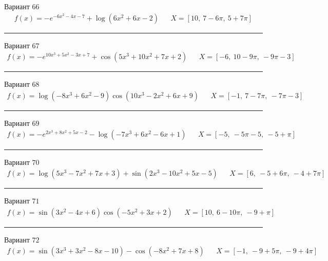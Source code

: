 \documentclass[11pt]{report}
\begin{document}
Вариант \(66\)
\begin{align*}
    f(x) = - e^{- 6 x^{2} - 4 x - 7} + \log{\left(6 x^{2} + 6 x - 2 \right)} && X = \left[ 10, \  7 - 6 \pi, \  5 + 7 \pi\right]
\end{align*}
\begin{center}
    \noindent\rule{8cm}{0.4pt}
\end{center}
Вариант \(67\)
\begin{align*}
    f(x) = - e^{10 x^{3} + 5 x^{2} - 3 x + 7} + \cos{\left(5 x^{3} + 10 x^{2} + 7 x + 2 \right)} && X = \left[ -6, \  10 - 9 \pi, \  - 9 \pi - 3\right]
\end{align*}
\begin{center}
    \noindent\rule{8cm}{0.4pt}
\end{center}
Вариант \(68\)
\begin{align*}
    f(x) = \log{\left(- 8 x^{3} + 6 x^{2} - 9 \right)} \cos{\left(10 x^{3} - 2 x^{2} + 6 x + 9 \right)} && X = \left[ -1, \  7 - 7 \pi, \  - 7 \pi - 3\right]
\end{align*}
\begin{center}
    \noindent\rule{8cm}{0.4pt}
\end{center}
Вариант \(69\)
\begin{align*}
    f(x) = - e^{2 x^{3} + 8 x^{2} + 5 x - 2} - \log{\left(- 7 x^{3} + 6 x^{2} - 6 x + 1 \right)} && X = \left[ -5, \  - 5 \pi - 5, \  -5 + \pi\right]
\end{align*}
\begin{center}
    \noindent\rule{8cm}{0.4pt}
\end{center}
Вариант \(70\)
\begin{align*}
    f(x) = \log{\left(5 x^{3} - 7 x^{2} + 7 x + 3 \right)} + \sin{\left(2 x^{3} - 10 x^{2} + 5 x - 5 \right)} && X = \left[ 6, \  -5 + 6 \pi, \  -4 + 7 \pi\right]
\end{align*}
\begin{center}
    \noindent\rule{8cm}{0.4pt}
\end{center}
Вариант \(71\)
\begin{align*}
    f(x) = \sin{\left(3 x^{2} - 4 x + 6 \right)} \cos{\left(- 5 x^{2} + 3 x + 2 \right)} && X = \left[ 10, \  6 - 10 \pi, \  -9 + \pi\right]
\end{align*}
\begin{center}
    \noindent\rule{8cm}{0.4pt}
\end{center}
Вариант \(72\)
\begin{align*}
    f(x) = \sin{\left(3 x^{3} + 3 x^{2} - 8 x - 10 \right)} - \cos{\left(- 8 x^{2} + 7 x + 8 \right)} && X = \left[ -1, \  -9 + 5 \pi, \  -9 + 4 \pi\right]
\end{align*}
\end{document}
